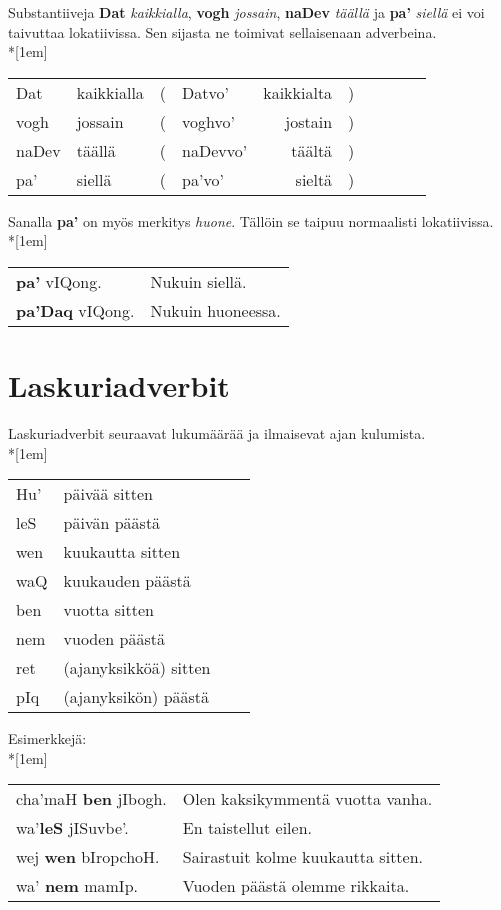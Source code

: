 \documentclass{book}
\begin{document}
Substantiiveja \textbf{Dat} \textit{kaikkialla}, \textbf{vogh} \textit{jossain}, \textbf{naDev} \textit{täällä} ja \textbf{pa'} \textit{siellä} ei voi taivuttaa lokatiivissa.
Sen sijasta ne toimivat sellaisenaan adverbeina.\\*[1em]
\begin{tabular}{Bl Il | r Bl Il l}
    Dat & kaikkialla & ( & Datvo' & kaikkialta & ) \\
    vogh & jossain & ( & voghvo' & jostain & ) \\
    naDev & täällä & ( & naDevvo' & täältä & ) \\
    pa' & siellä & ( & pa'vo' & sieltä & ) \\
\end{tabular}

Sanalla \textbf{pa'} on myös merkitys \textit{huone}.
Tällöin se taipuu normaalisti lokatiivissa.\\*[1em]
\begin{tabular}{l l}
    \textbf{pa'} vIQong. & Nukuin siellä. \\
    \textbf{pa'Daq} vIQong. & Nukuin huoneessa. \\
\end{tabular}

\section{Laskuriadverbit}

Laskuriadverbit seuraavat lukumäärää ja ilmaisevat ajan kulumista.\\*[1em]
\begin{tabular}{Bl Il}
    Hu' & päivää sitten \\
    leS & päivän päästä \\
    wen & kuukautta sitten \\
    waQ & kuukauden päästä \\
    ben & vuotta sitten \\
    nem & vuoden päästä \\
    ret & (ajanyksikköä) sitten \\
    pIq & (ajanyksikön) päästä \\
\end{tabular}

Esimerkkejä:\\*[1em]
\begin{tabular}{l l}
    cha'maH \textbf{ben} jIbogh. & Olen kaksikymmentä vuotta vanha. \\
    wa'\textbf{leS} jISuvbe'. & En taistellut eilen. \\
    wej \textbf{wen} bIropchoH. & Sairastuit kolme kuukautta sitten. \\
    wa' \textbf{nem} mamIp. & Vuoden päästä olemme rikkaita. \\
\end{tabular}
\end{document}
